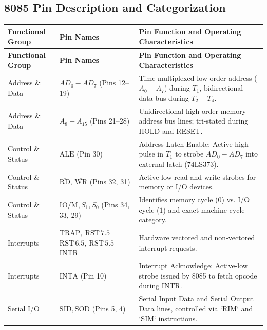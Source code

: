 \documentclass[12pt,a4paper]{article}
\renewcommand{\arraystretch}{1.45}
\begin{document}
\subsection{8085 Pin Description and Categorization}
\par\vspace{4pt}\noindent
\begingroup
\renewcommand{\arraystretch}{1.2}
\setlength{\extrarowheight}{1.5pt}
\begingroup
\setlength{\LTleft}{0pt}
\setlength{\LTright}{0pt}
\begin{longtable}{|B{2.8cm}|B{2.8cm}|>{\small\raggedright\arraybackslash}m{\dimexpr(\linewidth-2.8cm-2.8cm-6\arrayrulewidth)/1\relax}|}
\hline
\textbf{Functional Group} & \textbf{Pin Names} & \textbf{Pin Function and Operating Characteristics} \\ \hline
\endfirsthead
\hline
\textbf{Functional Group} & \textbf{Pin Names} & \textbf{Pin Function and Operating Characteristics} \\ \hline
\endhead
Address \& Data & $AD_0-AD_7$ (Pins 12--19) & Time-multiplexed low-order address ($A_0-A_7$) during $T_1$, bidirectional data bus during $T_2-T_4$. \\ \hline
Address \& Data & $A_8-A_{15}$ (Pins 21--28) & Unidirectional high-order memory address bus lines; tri-stated during HOLD and RESET. \\ \hline
Control \& Status & $\mathrm{ALE}$ (Pin 30) & Address Latch Enable: Active-high pulse in $T_1$ to strobe $AD_0-AD_7$ into external latch (74LS373). \\ \hline
Control \& Status & $\overline{\mathrm{RD}}$, $\overline{\mathrm{WR}}$ (Pins 32, 31) & Active-low read and write strobes for memory or I/O devices. \\ \hline
Control \& Status & $\mathrm{IO}/\overline{\mathrm{M}}, S_1, S_0$ (Pins 34, 33, 29) & Identifies memory cycle ($0$) vs. I/O cycle ($1$) and exact machine cycle category. \\ \hline
Interrupts & $\mathrm{TRAP},\ \mathrm{RST\,7.5}$\newline $\mathrm{RST\,6.5},\ \mathrm{RST\,5.5}$\newline $\mathrm{INTR}$ & Hardware vectored and non-vectored interrupt requests. \\ \hline
Interrupts & $\overline{\mathrm{INTA}}$ (Pin 10) & Interrupt Acknowledge: Active-low strobe issued by 8085 to fetch opcode during INTR. \\ \hline
Serial I/O & $\mathrm{SID}, \mathrm{SOD}$ (Pins 5, 4) & Serial Input Data and Serial Output Data lines, controlled via `RIM` and `SIM` instructions. \\ \hline

\end{longtable}
\end{document}
